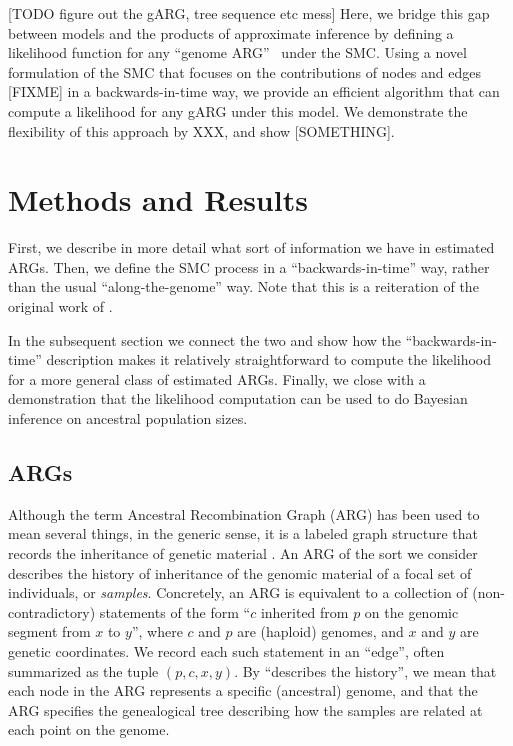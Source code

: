 \documentclass{article}
\begin{document}
[TODO figure out the gARG, tree sequence etc mess]
Here, we bridge this gap between models and the products of approximate
inference by defining a likelihood function for any 
``genome ARG''~\citep{wong_general_2023} under the SMC. Using a novel
formulation of the SMC that focuses on the contributions of nodes and 
edges [FIXME] in a backwards-in-time way, we provide an efficient 
algorithm that can compute a likelihood for any gARG under this model.
We demonstrate the flexibility of this approach by XXX, and show
[SOMETHING]. 


\section{Methods and Results}

First, 
we describe
in more detail what sort of information we have in estimated ARGs.
Then,
we define the SMC process in a ``backwards-in-time'' way,
rather than the usual ``along-the-genome'' way.
Note that this is a
reiteration of the original work of \citet{mcvean_approximating_2005}.

In the subsequent section we connect the two and
show how the ``backwards-in-time'' description
makes it relatively straightforward to compute the likelihood
for a more general class of estimated ARGs.
Finally, we close with a demonstration that the likelihood computation can be used
to do Bayesian inference on ancestral population sizes.

\subsection{ARGs} \label{par:recording}

Although the term Ancestral Recombination Graph (ARG) has been used to mean several things,
in the generic sense, it is a labeled graph structure that records
the inheritance of genetic material \citep{wong_general_2023}.
An ARG of the sort we consider describes the history of inheritance
of the genomic material of a focal set of individuals, or \emph{samples}.
Concretely, an ARG is equivalent to a collection of (non-contradictory) statements
of the form ``$c$ inherited from $p$ on the genomic segment from $x$ to $y$'',
where $c$ and $p$ are (haploid) genomes, and $x$ and $y$ are genetic coordinates.
We record each such statement in an ``edge'',
often summarized as the tuple $(p,c,x,y)$.
By ``describes the history'',
we mean that each node in the ARG represents a specific (ancestral) genome,
and that the ARG specifies the genealogical tree describing how the samples are related
at each point on the genome.
\end{document}

